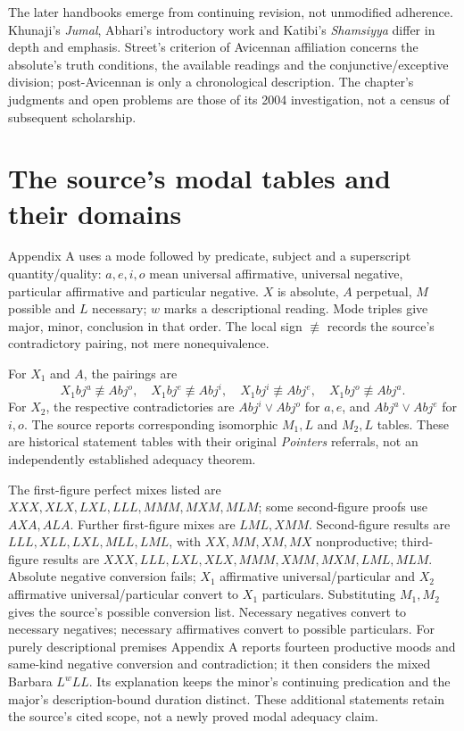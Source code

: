 The later handbooks emerge from continuing
revision, not unmodified adherence. Khunaji's
\emph{Jumal}, Abhari's introductory work and
Katibi's \emph{Shamsiyya} differ in depth
and emphasis. Street's criterion of Avicennan
affiliation concerns the absolute's truth
conditions, the available readings and the
conjunctive/exceptive division; post-Avicennan
is only a chronological description.
The chapter's judgments and open problems
are those of its 2004 investigation, not
a census of subsequent scholarship.
\cite[pp.~579--585]{Street2004ArabicLogicHHL}

\section{The source's modal tables and their domains}
\label{sec:p13-street-2004-modal-tables}

Appendix A uses a mode followed by predicate,
subject and a superscript quantity/quality:
\(a,e,i,o\) mean universal affirmative,
universal negative, particular affirmative
and particular negative. \(X\) is absolute,
\(A\) perpetual, \(M\) possible and \(L\)
necessary; \(w\) marks a descriptional
reading. Mode triples give major, minor,
conclusion in that order. The local sign
\(\not\equiv\) records the source's
contradictory pairing, not mere nonequivalence.
\cite[pp.~590--592]{Street2004ArabicLogicHHL}

For \(X_1\) and \(A\), the pairings are
\[
 X_1bj^a\not\equiv Abj^o,\quad
 X_1bj^e\not\equiv Abj^i,\quad
 X_1bj^i\not\equiv Abj^e,\quad
 X_1bj^o\not\equiv Abj^a.
\]
For \(X_2\), the respective contradictories
are \(Abj^i\lor Abj^o\) for \(a,e\),
and \(Abj^a\lor Abj^e\) for \(i,o\).
The source reports corresponding isomorphic
\(M_1,L\) and \(M_2,L\) tables.
These are historical statement tables with
their original \emph{Pointers} referrals,
not an independently established adequacy theorem.

The first-figure perfect mixes listed are
\(XXX,XLX,LXL,LLL,MMM,MXM,MLM\);
some second-figure proofs use \(AXA,ALA\).
Further first-figure mixes are \(LML,XMM\).
Second-figure results are \(LLL,XLL,LXL,MLL,LML\),
with \(XX,MM,XM,MX\) nonproductive;
third-figure results are
\(XXX,LLL,LXL,XLX,MMM,XMM,MXM,LML,MLM\).
Absolute negative conversion fails;
\(X_1\) affirmative universal/particular
and \(X_2\) affirmative universal/particular
convert to \(X_1\) particulars. Substituting
\(M_1,M_2\) gives the source's possible
conversion list. Necessary negatives convert
to necessary negatives; necessary affirmatives
convert to possible particulars. For purely
descriptional premises Appendix A reports
fourteen productive moods and same-kind
negative conversion and contradiction;
it then considers the mixed Barbara
\(L^wLL\). Its explanation keeps the
minor's continuing predication and the
major's description-bound duration distinct.
These additional statements retain the
source's cited scope, not a newly proved
modal adequacy claim.
\cite[pp.~590--591]{Street2004ArabicLogicHHL}


